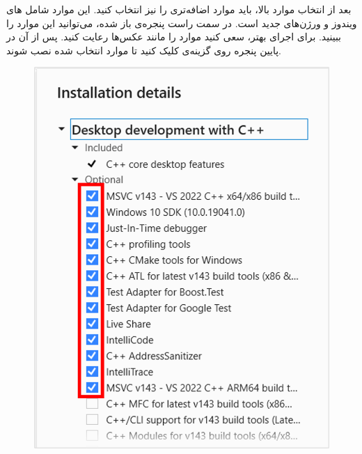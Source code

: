 {\begin{spacing}{1.5}
        بعد از انتخاب موارد بالا، باید موارد اضافه‌تری را نیز انتخاب کنید. این موارد شامل ‌های ویندوز و ورژن‌های جدید  است.
        در سمت راست پنجره‌ی باز شده، می‌توانید این موارد را ببینید. برای اجرای بهتر، سعی کنید موارد را مانند عکس‌ها رعایت کنید. پس از آن در پایین پنجره روی گزینه‌ی  کلیک کنید تا موارد انتخاب شده نصب شوند.

        \begin{figure}[H]
            \centering
            \setlength{\belowcaptionskip}{-10pt}
            \includegraphics[scale=0.6]{Images/3/3.Intro.3.1} \hspace{5mm}

\end{figure}
\end{spacing}}
